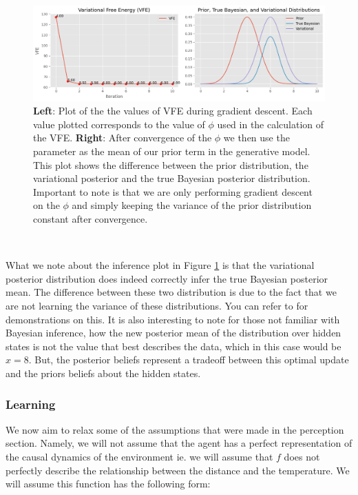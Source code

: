 \documentclass{article}
\begin{document}
\begin{figure}[htbp]
    \centering
    \includegraphics[scale=0.55]{images/pc_example_perception.png}
    \caption{\textbf{Left}: Plot of the the values of VFE during gradient descent. Each value plotted corresponds to the value of $\phi$ used in the calculation of the VFE. \textbf{Right}: After convergence of the $\phi$ we then use the parameter as the mean of our prior term in the generative model. This plot shows the difference between the prior distribution, the variational posterior and the true Bayesian posterior distribution. Important to note is that we are only performing gradient descent on the $\phi$ and simply keeping the variance of the prior distribution constant after convergence.}
    \label{fig:pc_example_perception}
\end{figure}

\

What we note about the inference plot in Figure \ref{fig:pc_example_perception} is that the variational posterior distribution does indeed correctly infer the true Bayesian posterior mean. The difference between these two distribution is due to the fact that we are not learning the variance of these distributions. You can refer to \citet{bogacz2017tutorial, friston2003learning} for demonstrations on this. It is also interesting to note for those not familiar with Bayesian inference, how the new posterior mean of the distribution over hidden states is not the value that best describes the data, which in this case would be $x = 8$. But, the posterior beliefs represent a tradeoff between this optimal update and the priors beliefs about the hidden states.

\subsubsection{Learning}

We now aim to relax some of the assumptions that were made in the perception section. Namely, we will not assume that the agent has a perfect representation of the causal dynamics of the environment ie. we will assume that $f$ does not perfectly describe the relationship between the distance and the temperature. We will assume this function has the following form:
\end{document}
